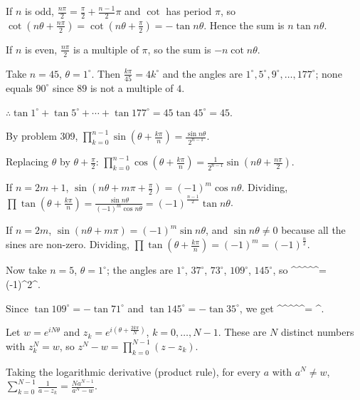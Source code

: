   If $n$ is odd, $\frac{n\pi}{2} = \frac{\pi}{2} + \frac{n - 1}{2}\pi$ and $\cot$ has period $\pi$, so
  $\cot\left(n\theta + \frac{n\pi}{2}\right) = \cot\left(n\theta + \frac{\pi}{2}\right) = -\tan n\theta$. Hence the
  sum is $n\tan n\theta$.

  If $n$ is even, $\frac{n\pi}{2}$ is a multiple of $\pi$, so the sum is $-n\cot n\theta$.

  Take $n = 45$, $\theta = 1^\circ$. Then $\frac{k\pi}{45} = 4k^\circ$ and the angles are $1^\circ, 5^\circ,
  9^\circ, \ldots, 177^\circ$; none equals $90^\circ$ since $89$ is not a multiple of $4$.

  $\therefore \tan1^\circ + \tan5^\circ + \cdots + \tan177^\circ = 45\tan45^\circ = 45$.
\item By problem 309, $\displaystyle\prod_{k = 0}^{n - 1}\sin\left(\theta + \frac{k\pi}{n}\right) = \frac{\sin
    n\theta}{2^{n - 1}}$.

  Replacing $\theta$ by $\theta + \frac{\pi}{2}$: $\displaystyle\prod_{k = 0}^{n - 1}\cos\left(\theta
  + \frac{k\pi}{n}\right) = \frac{1}{2^{n - 1}}\sin\left(n\theta + \frac{n\pi}{2}\right)$.

  If $n = 2m + 1$, $\sin\left(n\theta + m\pi + \frac{\pi}{2}\right) = (-1)^m\cos n\theta$. Dividing,
  $\displaystyle\prod\tan\left(\theta + \frac{k\pi}{n}\right) = \frac{\sin n\theta}{(-1)^m\cos n\theta} = (-1)^{\frac{n -
      1}{2}}\tan n\theta$.

  If $n = 2m$, $\sin(n\theta + m\pi) = (-1)^m\sin n\theta$, and $\sin n\theta\neq 0$ because all the sines are
  non-zero. Dividing, $\displaystyle\prod\tan\left(\theta + \frac{k\pi}{n}\right) = (-1)^m = (-1)^{\frac{n}{2}}$.

  Now take $n = 5$, $\theta = 1^\circ$; the angles are $1^\circ$, $37^\circ$, $73^\circ$, $109^\circ$, $145^\circ$,
  so
  \startformula
    ^\circ{}^\circ{}^\circ{}^\circ{}^\circ = (-1)^2^\circ.
  \stopformula

  Since $\tan109^\circ = -\tan71^\circ$ and $\tan145^\circ = -\tan35^\circ$, we get
  \startformula
    ^\circ{}^\circ{}^\circ{}^\circ{}^\circ = ^\circ.
  \stopformula
\item Let $w = e^{iN\theta}$ and $z_k = e^{i\left(\theta + \frac{2k\pi}{N}\right)}$, $k = 0, \ldots, N - 1$.
  These are $N$ distinct numbers with $z_k^N = w$, so $z^N - w = \displaystyle\prod_{k = 0}^{N - 1}(z - z_k)$.

  Taking the logarithmic derivative (product rule), for every $a$ with $a^N\neq w$, $\displaystyle\sum_{k = 0}^{N
    - 1}\frac{1}{a - z_k} = \frac{Na^{N - 1}}{a^N - w}$.


